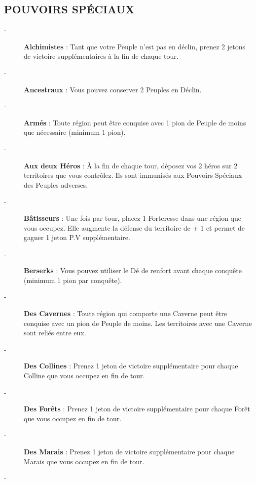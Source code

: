 \documentclass{scrartcl}%
\begin{document}
\subsection{ POUVOIRS SPÉCIAUX
}%
\label{subsec:POUVOIRSSPCIAUX}%
\begin{description}%
\item[{-} ]%
%
\textcolor{mygreen}{%
\textbf{Alchimistes}%
}%
\textit{ }%
 : Tant que votre Peuple n'est pas en déclin, prenez 2 jetons de victoire supplémentaires à la fin de chaque tour.
%
\item[{-} ]%
%
\textcolor{mygreen}{%
\textbf{Ancestraux}%
}%
\textit{ }%
 : Vous pouvez conserver 2 Peuples en Déclin.
%
\item[{-} ]%
%
\textcolor{mygreen}{%
\textbf{Armés}%
}%
\textit{ }%
 : Toute région peut être conquise avec 1 pion de Peuple de moins que nécessaire (minimum 1 pion).
%
\item[{-} ]%
%
\textcolor{mygreen}{%
\textbf{Aux deux Héros}%
}%
\textit{ }%
 : À la fin de chaque tour, déposez vos 2 héros sur 2 territoires que vous contrôlez. Ils sont immunisés aux Pouvoirs Spéciaux des Peuples adverses.
%
\item[{-} ]%
%
\textcolor{mygreen}{%
\textbf{Bâtisseurs}%
}%
\textit{ }%
 : Une fois par tour, placez 1 Forteresse dans une région que vous occupez. Elle augmente la défense du territoire de + 1 et permet de gagner 1 jeton P.V supplémentaire.
%
\item[{-} ]%
%
\textcolor{mygreen}{%
\textbf{Berserks}%
}%
\textit{ }%
 : Vous pouvez utiliser le Dé de renfort avant chaque conquête (minimum 1 pion par conquête).
%
\item[{-} ]%
%
\textcolor{mygreen}{%
\textbf{Des Cavernes}%
}%
\textit{ }%
 : Toute région qui comporte une Caverne peut être conquise avec un pion de Peuple de moins. Les territoires avec une Caverne sont reliés entre eux.
%
\item[{-} ]%
%
\textcolor{mygreen}{%
\textbf{Des Collines}%
}%
\textit{ }%
 : Prenez 1 jeton de victoire supplémentaire pour chaque Colline que vous occupez en fin de tour.
%
\item[{-} ]%
%
\textcolor{mygreen}{%
\textbf{Des Forêts}%
}%
\textit{ }%
 : Prenez 1 jeton de victoire supplémentaire pour chaque Forêt que vous occupez en fin de tour.
%
\item[{-} ]%
%
\textcolor{mygreen}{%
\textbf{Des Marais}%
}%
\textit{ }%
 : Prenez 1 jeton de victoire supplémentaire pour chaque Marais que vous occupez en fin de tour.
%
\item[{-} ]%

\end{description}
\end{document}
